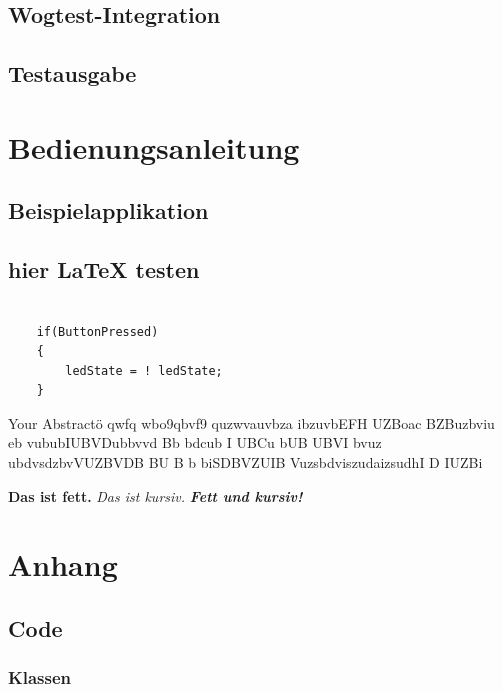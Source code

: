 \documentclass[12pt,a4paper]{article}
\begin{document}
\subsection{Wogtest-Integration}
\subsection{Testausgabe}

\newpage

\section{Bedienungsanleitung}
\subsection{Beispielapplikation}
\subsection{hier LaTeX testen}
\begin{verbatim}

    if(ButtonPressed)
    {
        ledState = ! ledState;
    }

\end{verbatim}

Your Abstractö qwfq wbo9qbvf9 quzwvauvbza ibzuvbEFH UZBoac BZBuzbviu eb vububIUBVDubbvvd Bb bdcub I UBCu bUB UBVI bvuz ubdvsdzbvVUZBVDB BU B b  biSDBVZUIB VuzsbdviszudaizsudhI D IUZBi


\textbf{Das ist fett.}
\textit{Das ist kursiv.}
\textbf{\textit{Fett und kursiv!}}

\subsection{}
\newpage

\section{Anhang}
\subsection{Code}
\subsubsection{Klassen}
\end{document}
